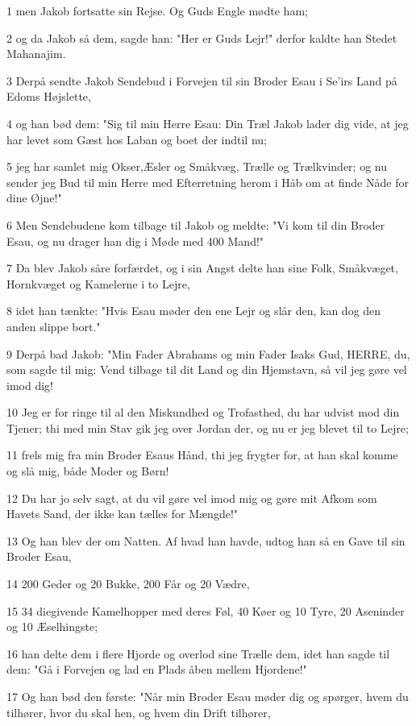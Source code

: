 \par 1 men Jakob fortsatte sin Rejse. Og Guds Engle mødte ham;
\par 2 og da Jakob så dem, sagde han: "Her er Guds Lejr!" derfor kaldte han Stedet Mahanajim.
\par 3 Derpå sendte Jakob Sendebud i Forvejen til sin Broder Esau i Se'irs Land på Edoms Højslette,
\par 4 og han bød dem: "Sig til min Herre Esau: Din Træl Jakob lader dig vide, at jeg har levet som Gæst hos Laban og boet der indtil nu;
\par 5 jeg har samlet mig Okser,Æsler og Småkvæg, Trælle og Trælkvinder; og nu sender jeg Bud til min Herre med Efterretning herom i Håb om at finde Nåde for dine Øjne!"
\par 6 Men Sendebudene kom tilbage til Jakob og meldte: "Vi kom til din Broder Esau, og nu drager han dig i Møde med 400 Mand!"
\par 7 Da blev Jakob såre forfærdet, og i sin Angst delte han sine Folk, Småkvæget, Hornkvæget og Kamelerne i to Lejre,
\par 8 idet han tænkte: "Hvis Esau møder den ene Lejr og slår den, kan dog den anden slippe bort."
\par 9 Derpå bad Jakob: "Min Fader Abrahams og min Fader Isaks Gud, HERRE, du, som sagde til mig: Vend tilbage til dit Land og din Hjemstavn, så vil jeg gøre vel imod dig!
\par 10 Jeg er for ringe til al den Miskundhed og Trofasthed, du har udvist mod din Tjener; thi med min Stav gik jeg over Jordan der, og nu er jeg blevet til to Lejre;
\par 11 frels mig fra min Broder Esaus Hånd, thi jeg frygter for, at han skal komme og slå mig, både Moder og Børn!
\par 12 Du har jo selv sagt, at du vil gøre vel imod mig og gøre mit Afkom som Havets Sand, der ikke kan tælles for Mængde!"
\par 13 Og han blev der om Natten. Af hvad han havde, udtog han så en Gave til sin Broder Esau,
\par 14 200 Geder og 20 Bukke, 200 Får og 20 Vædre,
\par 15 34 diegivende Kamelhopper med deres Føl, 40 Køer og 10 Tyre, 20 Aseninder og 10 Æselhingste;
\par 16 han delte dem i flere Hjorde og overlod sine Trælle dem, idet han sagde til dem: "Gå i Forvejen og lad en Plads åben mellem Hjordene!"
\par 17 Og han bød den første: "Når min Broder Esau møder dig og spørger, hvem du tilhører, hvor du skal hen, og hvem din Drift tilhører,
